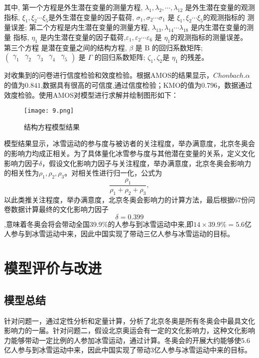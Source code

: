 \documentclass[withoutpreface,bwprint]{cumcmthesis} %
\begin{document}
其中, 第一个方程是外生潜在变量的测量方程,  $\lambda_{1}, \lambda_{2}, \cdots, \lambda_{12} $ 是外生潜在变量的观测指标,  $\xi_{1}, \xi_{2} \cdots \xi_{5}  $是外生潜在变量的因子载荷, $ \sigma_{1}, \sigma_{2} \cdots \sigma_{1}$  是 $ \xi_{1}, \xi_{2} \cdots \xi_{5}  $的观测指标的 测量误差; 第二个方程是内生潜在变量的测量方程, $ \lambda_{13}, \lambda_{14} \cdots \lambda_{18} $ 是内生潜在变量的测量 指标, $ \eta_{1} $ 是内生潜在变量的因子载荷,$  \varepsilon_{1}, \varepsilon_{2} \cdots \varepsilon_{6} $ 是 $ \eta_{1}  $的观测指标的测量误差。 第三个方程 是潜在变量之间的结构方程,  $ \beta  $ 是 $  \mathrm{B}  $ 的回归系数矩阵; $ \left(\begin{array}{lllll}\gamma_{1} & \gamma_{2} & \gamma_{3} & \gamma_{4} & \gamma_{5} \end{array}\right)$  是 $ \Gamma$  的回归系数矩阵;  $\zeta_{1}, \zeta_{2}  $是  $\eta_{1}$ 的残差。

对收集到的问卷进行信度检验和效度检验。根据AMOS的结果显示，$Chonbach.\alpha$的值为$0.841$,数据具有很高的可信度,通过信度检验；KMO的值为0.796，数据通过效度检验。使用AMOS对模型进行求解并绘制图形如下：
\begin{figure}[H]
	\centering
	\texttt{[image: 9.png]}
	\caption{结构方程模型结果}
	\label{9}
\end{figure}

模型结果显示，冰雪运动的参与度与被访者的关注程度，举办满意度，北京冬奥会的影响力均成正相关。为了具体量化冰雪参与度与其他潜在变量的关系，定义文化影响力因子$\delta$，假设文化影响力因子与关注程度，举办满意度，北京冬奥会影响力的相关性为$\rho_1,\rho_2,\rho_3$。对相关性进行归一化，公式为$$\frac{\rho_1}{\rho_1+\rho_2+\rho_3},$$以此类推关注程度，举办满意度，北京冬奥会影响力的计算方法，最后根据67份问卷数据计算最终的文化影响力因子$$\delta=0.399$$,意味着冬奥会将会带动全国39.9\%的人参与到冰雪运动中来,即$14 \times 39.9\%=5.6$亿人参与到冰雪运动中来，因此中国实现了带动三亿人参与冰雪运动的目标。

\section{模型评价与改进}
\subsection{模型总结}
针对问题一，通过定性分析和定量计算，分析了北京冬奥是所有冬奥会中最具文化影响力的一届。针对问题二，假设北京奥运会有一定的文化影响力，这种文化影响力能够带动一定比例的人参加冰雪运动，通过计算。冬奥会的开展大约能够使5.6亿人参与到冰雪运动中来，因此中国实现了带动3亿人参与冰雪运动中来的目标。
\end{document}
